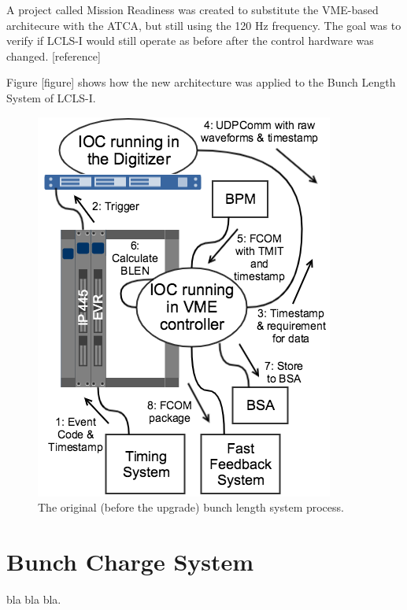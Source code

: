 \documentclass[letter,
               biblatex,     %
               keeplastbox,   %
               ]{jacow}
\begin{document}
A project called Mission Readiness was created to substitute the VME-based architecure with the ATCA, but still using the 120 Hz frequency. The goal was to verify if LCLS-I would still operate as before after the control hardware was changed. [reference]

Figure [figure] shows how the new architecture was applied to the Bunch Length System of LCLS-I.

\begin{figure}[!htb]
   \centering
   \includegraphics*[width=\columnwidth]{BLEN_VME_Process}
   \caption{The original (before the upgrade) bunch length system process.}
   \label{fig:blen_atca}
\end{figure}


\section{Bunch Charge System}
bla bla bla.
\end{document}
